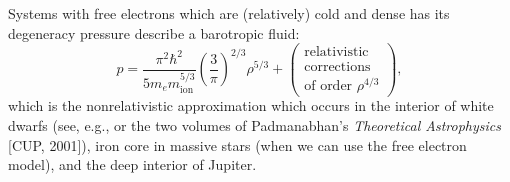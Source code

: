 \begin{node}
\begin{definition}
\begin{example}\label{fluids:euler-flow-000Z}%
Systems with free electrons which are (relatively) cold and dense has
its degeneracy pressure describe a barotropic fluid: 
\begin{equation*}
p = \frac{\pi^{2}\hbar^{2}}{5m_{e}m_{\text{ion}}^{5/3}}\left(\frac{3}{\pi}\right)^{2/3}\rho^{5/3}
+\begin{pmatrix}\mbox{relativistic}\\\mbox{corrections}\\
\mbox{of order }\rho^{4/3}\end{pmatrix},
\end{equation*}
which is the nonrelativistic approximation which occurs in the interior
of white dwarfs (see, e.g.,  or the two volumes
of Padmanabhan's \textit{Theoretical Astrophysics} [CUP, 2001]), iron core in
massive stars (when we can use the free electron model), and the deep
interior of Jupiter. 
\end{example}
\end{definition}
\end{node} %

